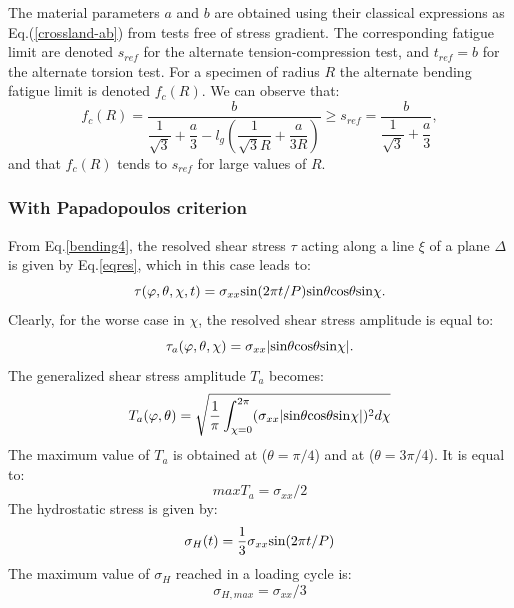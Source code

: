 The material parameters $a$ and $b$ are obtained using their classical expressions as Eq.(\ref{crossland-ab}) from tests free of stress gradient. The corresponding fatigue limit are denoted $s_{ref}$ for the alternate tension-compression test, and $t_{ref}= b$ for the alternate torsion test. For a specimen of radius $R$
the alternate bending fatigue limit is denoted $f_c(R)$.
We can observe that:
\begin{equation}
	f_c(R)=\dfrac{b}{\dfrac{1}{\sqrt{3}}+\dfrac{a}{3}-l_g\left( \dfrac{1}{\sqrt{3}R}+\dfrac{a}{3R}\right) }\geqslant s_{ref} = \dfrac{b}{\dfrac{1}{\sqrt{3}}+\dfrac{a}{3}},
	\label{crossland-fr}
\end{equation}
and that $f_c(R)$ tends to $s_{ref}$ for large values of $R$.

\subsubsection{With Papadopoulos criterion}  
From Eq.\eqref{bending4}, the resolved shear stress $\tau$ acting along a line $\xi$ of a plane $\Delta$ is given by Eq.\eqref{eqres}, which in this case leads to:
\begin{equation}
	\tau(\varphi,\theta,\chi,t)=\sigma_{xx}\textnormal{sin}(2\pi t/P)\textnormal{sin}\theta \textnormal{cos}\theta \textnormal{sin}\chi.
\end{equation}
Clearly, for the worse case in $\chi$,  the resolved shear stress amplitude is equal to:
\begin{equation}
	\tau_a(\varphi,\theta,\chi)=\sigma_{xx}|\textnormal{sin}\theta \textnormal{cos}\theta \textnormal{sin}\chi|.
\end{equation}
The generalized shear stress amplitude $T_a$ becomes:
\begin{equation}
	T_a(\varphi,\theta)=\sqrt{\dfrac{1}{\pi}\int_{\chi=0}^{2\pi}(\sigma_{xx}|\textnormal{sin}\theta \textnormal{cos}\theta \textnormal{sin}\chi|)^2d\chi}
\end{equation}
The maximum value of $T_a$ is obtained at ($\theta=\pi/4$) and at ($\theta=3\pi/4$). It is equal to:
\begin{equation}
	maxT_a=\sigma_{xx}/2
\end{equation}
The hydrostatic stress is given by:
\begin{equation}
	\sigma_{H}(t)=\dfrac{1}{3}\sigma_{xx}\textnormal{sin}(2\pi t/P)
\end{equation}
The maximum value of $\sigma_H$ reached in a loading cycle is:
\begin{equation}
	\sigma_{H,max}=\sigma_{xx}/3
\end{equation}
